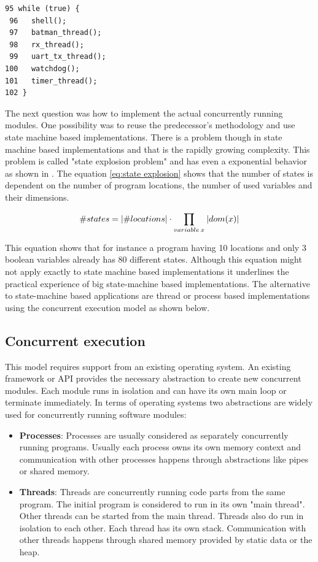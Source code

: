 \begin{lstlisting}[label=lst:urbaniak_main,caption=main function implementation]
 95 while (true) {
 96   shell();
 97   batman_thread();
 98   rx_thread();
 99   uart_tx_thread();
100   watchdog();
101   timer_thread();
102 }
\end{lstlisting}

The next question was how to implement the actual concurrently running modules. One possibility was to reuse the predecessor's methodology and use state machine based implementations. There is a problem though in state machine based implementations and that is the rapidly growing complexity. This problem is called "state explosion problem" and has even a exponential behavior as shown in \cite{katoen}. The equation \ref{eq:state explosion} shows that the number of states is dependent on the number of program locations, the number of used variables and their dimensions.

\begin{equation}
\label{eq:state explosion}
\#states = \lvert\#locations\rvert \cdot \prod_{variable \: x} \: \lvert dom(x)\rvert
\end{equation}

This equation shows that for instance a program having 10 locations and only 3 boolean variables already has 80 different states. Although this equation might not apply exactly to state machine based implementations it underlines the practical experience of big state-machine based implementations. The alternative to state-machine based applications are thread or process based implementations using the concurrent execution model as shown below.

\subsection{Concurrent execution}
This model requires support from an existing operating system. An existing framework or API provides the necessary abstraction to create new concurrent modules. Each module runs in isolation and can have its own main loop or terminate immediately. In terms of operating systems two abstractions are widely used for concurrently running software modules:

\begin{itemize}
\item \textbf{Processes}: Processes are usually considered as separately concurrently running programs. Usually each process owns its own memory context and communication with other processes happens through abstractions like pipes or shared memory.
\item \textbf{Threads}: Threads are concurrently running code parts from the same program. The initial program is considered to run in its own "main thread". Other threads can be started from the main thread. Threads also do run in isolation to each other. Each thread has its own stack. Communication with other threads happens through shared memory provided by static data or the heap.
\end{itemize}


